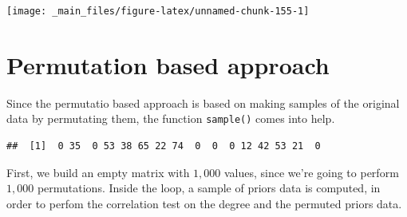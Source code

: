 \documentclass[
  notitlepage,
  onecolumn,
  openany]{book}
\newenvironment{Shaded}{\begin{snugshade}}{\end{snugshade}}
\newcommand{\AttributeTok}[1]{\textcolor[rgb]{0.77,0.63,0.00}{#1}}
\newcommand{\CommentTok}[1]{\textcolor[rgb]{0.56,0.35,0.01}{\textit{#1}}}
\newcommand{\DocumentationTok}[1]{\textcolor[rgb]{0.56,0.35,0.01}{\textbf{\textit{#1}}}}
\newcommand{\FunctionTok}[1]{\textcolor[rgb]{0.00,0.00,0.00}{#1}}
\newcommand{\NormalTok}[1]{#1}
\newcommand{\OtherTok}[1]{\textcolor[rgb]{0.56,0.35,0.01}{#1}}
\newcommand{\SpecialCharTok}[1]{\textcolor[rgb]{0.00,0.00,0.00}{#1}}
\begin{document}
\begin{Shaded}
\end{Shaded}

\begin{center}\texttt{[image: \_main\_files/figure-latex/unnamed-chunk-155-1]} \end{center}

\hypertarget{permutation-based-approach-1}{%
\section{Permutation based approach}\label{permutation-based-approach-1}}

Since the permutatio based approach is based on making samples of the original data by permutating them, the function \texttt{sample()} comes into help.

\begin{Shaded}
\end{Shaded}

\begin{verbatim}
##  [1]  0 35  0 53 38 65 22 74  0  0  0 12 42 53 21  0
\end{verbatim}

First, we build an empty matrix with \(1,000\) values, since we're going to perform \(1,000\) permutations. Inside the loop, a sample of priors data is computed, in order to perfom the correlation test on the degree and the permuted priors data.
\end{document}
